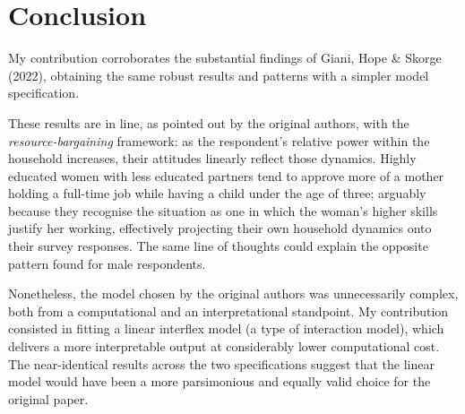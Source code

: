 \documentclass[12pt,letterpaper]{article}
\begin{document}
\vspace{1.5cm}

\section{Conclusion}

\vspace{0.5cm}

\noindent My contribution corroborates the substantial findings of Giani, Hope \& Skorge (2022), obtaining the same robust results and patterns with a simpler model specification.

\noindent These results are in line, as pointed out by the original authors, with the \emph{resource-bargaining} framework: as the respondent's relative power within the household increases, their attitudes linearly reflect those dynamics. Highly educated women with less educated partners tend to approve more of a mother holding a full-time job while having a child under the age of three; arguably because they recognise the situation as one in which the woman's higher skills justify her working, effectively projecting their own household dynamics onto their survey responses. The same line of thoughts could explain the opposite pattern found for male respondents. 

\noindent Nonetheless, the model chosen by the original authors was unnecessarily complex, both from a computational and an interpretational standpoint. My contribution consisted in fitting a linear interflex model (a type of interaction model), which delivers a more interpretable output at considerably lower computational cost. The near-identical results across the two specifications suggest that the linear model would have been a more parsimonious and equally valid choice for the original paper. 
\end{document}
